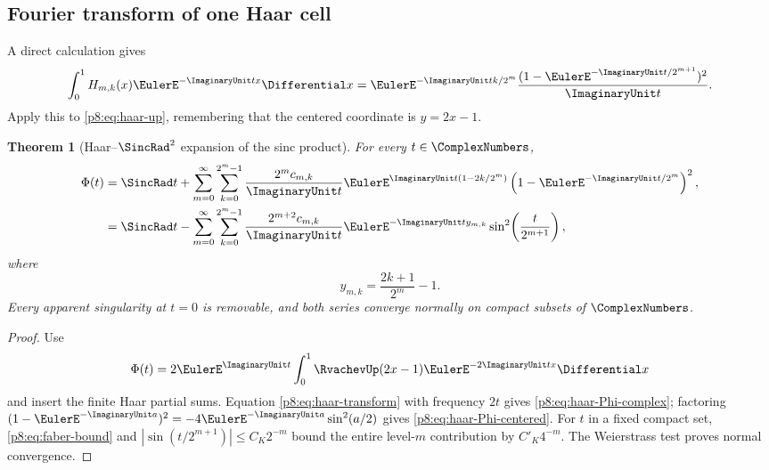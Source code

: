 \documentclass[11pt]{article}
\newtheorem{theorem}{Theorem}[section]
\theoremstyle{definition}
\theoremstyle{remark}
\begin{document}
\subsection{Fourier transform of one Haar cell}

A direct calculation gives
\begin{equation}
 \int_0^1H_{m,k}(x)\EulerE^{-\ImaginaryUnit tx}\Differential x
 =\EulerE^{-\ImaginaryUnit tk/2^m}
   \frac{(1-\EulerE^{-\ImaginaryUnit t/2^{m+1}})^2}{\ImaginaryUnit t}.              \label{p8:eq:haar-transform}
\end{equation}
Apply this to \eqref{p8:eq:haar-up}, remembering that the centered coordinate is
$y=2x-1$.

\begin{theorem}[Haar--$\SincRad^2$ expansion of the sinc product]
\label{p8:thm:haar-Phi}
For every $t\in\ComplexNumbers$,
\begin{align}
 \Phi(t)
 &=\SincRad t+
 \sum_{m=0}^\infty\sum_{k=0}^{2^m-1}
 \frac{2^m c_{m,k}}{\ImaginaryUnit t}
 \EulerE^{\ImaginaryUnit t(1-2k/2^m)}
 \left(1-\EulerE^{-\ImaginaryUnit t/2^m}\right)^2,                     \label{p8:eq:haar-Phi-complex}\\
 &=\SincRad t-
 \sum_{m=0}^\infty\sum_{k=0}^{2^m-1}
 \frac{2^{m+2}c_{m,k}}{\ImaginaryUnit t}
 \EulerE^{-\ImaginaryUnit t y_{m,k}}
 \sin^2\!\left(\frac{t}{2^{m+1}}\right),              \label{p8:eq:haar-Phi-centered}
\end{align}
where
\begin{equation}
 y_{m,k}=\frac{2k+1}{2^m}-1.                             \label{p8:eq:haar-center-y}
\end{equation}
Every apparent singularity at $t=0$ is removable, and both series converge
normally on compact subsets of $\ComplexNumbers$.
\end{theorem}

\begin{proof}
Use
\[
 \Phi(t)=2\EulerE^{\ImaginaryUnit t}\int_0^1\RvachevUp(2x-1)\EulerE^{-2\ImaginaryUnit tx}\Differential x
\]
and insert the finite Haar partial sums.  Equation
\eqref{p8:eq:haar-transform} with frequency $2t$ gives
\eqref{p8:eq:haar-Phi-complex}; factoring
$(1-\EulerE^{-\ImaginaryUnit a})^2=-4\EulerE^{-\ImaginaryUnit a}\sin^2(a/2)$ gives
\eqref{p8:eq:haar-Phi-centered}.  For $t$ in a fixed compact set,
\eqref{p8:eq:faber-bound} and
$|\sin(t/2^{m+1})|\le C_K2^{-m}$ bound the entire level-$m$ contribution by
$C'_K4^{-m}$.  The Weierstrass test proves normal convergence.
\end{proof}
\end{document}
